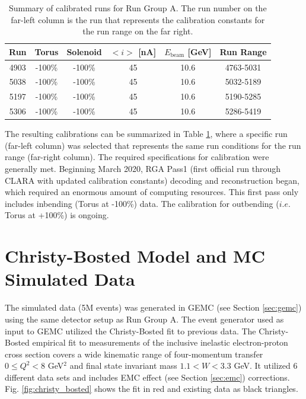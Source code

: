 \begin{table}[h!]
	\centering
	\begin{tabular}{ |c|c|c|c|c|c| } 
		\hline
		Run & Torus & Solenoid & $<i>$ [nA] & $E_{\mathrm{beam}}$ [GeV] & Run Range \\ 
		\hline
		4903 & -100\% & -100\% & 45 & 10.6 & 4763-5031 \\ 
		5038 & -100\% & -100\% & 45 & 10.6 & 5032-5189 \\ 
		5197 & -100\% & -100\% & 45 & 10.6 & 5190-5285 \\ 
		5306 & -100\% & -100\% & 45 & 10.6 & 5286-5419 \\ 
		\hline
	\end{tabular}
	\caption{Summary of calibrated runs for Run Group A. The run number on the far-left column is the run that represents the calibration constants for the run range on the far right.}
	\label{tab:cal}
\end{table}

The resulting calibrations can be summarized in Table \ref{tab:cal}, where a specific run (far-left column) was selected that represents the same run conditions for the run range (far-right column). The required specifications for calibration were generally met. Beginning March 2020, RGA Pass1 (first official run through CLARA with updated calibration constants) decoding and reconstruction began, which required an enormous amount of computing resources. This first pass only includes inbending (Torus at -100\%) data. The calibration for outbending ($i.e.$ Torus at +100\%) is ongoing.

\section{Christy-Bosted Model and MC Simulated Data}
The simulated data (5M events) was generated in GEMC (see Section \ref{sec:gemc}) using the same detector setup as Run Group A. The event generator used as input to GEMC utilized the Christy-Bosted fit \cite{christy_bosted} to previous data. The Christy-Bosted empirical fit to measurements of the inclusive inelastic electron-proton cross section covers a wide kinematic range of four-momentum transfer $0\leq Q^2< 8$ GeV$^2$ and final state invariant mass $1.1<W<3.3$ GeV. It utilized 6 different data sets and includes EMC effect (see Section \ref{sec:emc}) corrections. Fig. \ref{fig:christy_bosted} shows the fit in red and existing data as black triangles.

